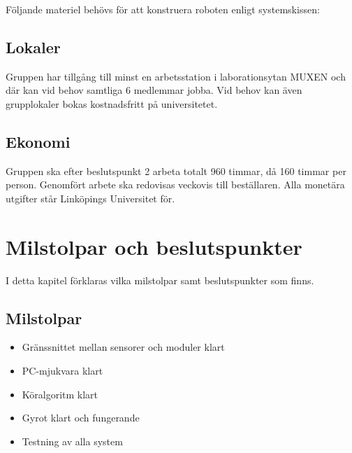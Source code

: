 \documentclass[a4paper,11pt]{article}
\begin{document}
    Följande materiel behövs för att konstruera roboten enligt systemskissen:
    
    \subsection{Lokaler}
    Gruppen har tillgång till minst en arbetsstation i laborationsytan MUXEN och där kan vid behov samtliga 6 medlemmar jobba. Vid behov kan även grupplokaler bokas kostnadsfritt på universitetet.
    
    \subsection{Ekonomi}
    Gruppen ska efter beslutspunkt 2 arbeta totalt 960 timmar, då 160 timmar per person. Genomfört arbete ska redovisas veckovis till beställaren. Alla monetära utgifter står Linköpings Universitet för.
    
    \section{Milstolpar och beslutspunkter}
    I detta kapitel förklaras vilka milstolpar samt beslutspunkter som finns.
    
    \subsection{Milstolpar}
    \begin{itemize}
        \item Gränssnittet mellan sensorer och moduler klart
        \item PC-mjukvara klart
        \item Köralgoritm klart
        \item Gyrot klart och fungerande
        \item Testning av alla system
    \end{itemize}
    
\end{document}
